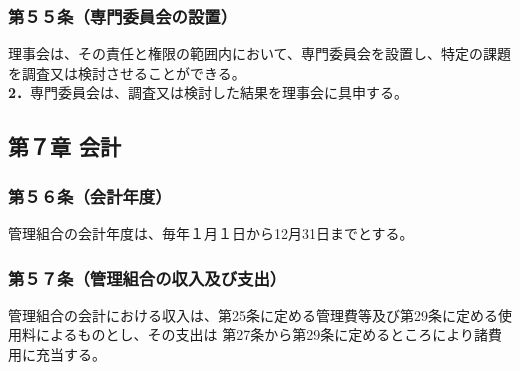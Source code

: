 \documentclass[
  luatex,
  paper=a4paper,
  fontsize=11pt,
  jafontsize=11pt,
  jlreq_notes,
]{jlreq}
\begin{document}
  \subsubsection*{第５５条（専門委員会の設置）}
  理事会は、その責任と権限の範囲内において、専門委員会を設置し、特定の課題を調査又は検討させることができる。\\
  \textbf{2．}専門委員会は、調査又は検討した結果を理事会に具申する。
  
  \begin{center}
  \subsection*{第７章 会計}
  \end{center}
  \subsubsection*{第５６条（会計年度）}
  管理組合の会計年度は、毎年１月１日から12月31日までとする。
  \subsubsection*{第５７条（管理組合の収入及び支出）}
  管理組合の会計における収入は、第25条に定める管理費等及び第29条に定める使用料によるものとし、その支出は
  第27条から第29条に定めるところにより諸費用に充当する。
\end{document}
